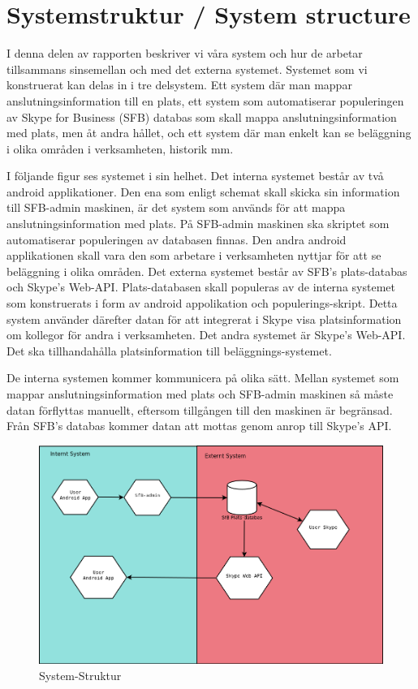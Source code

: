 \documentclass[a4paper,12pt]{article}
\begin{document}
\section{Systemstruktur / System structure}
I denna delen av rapporten beskriver vi våra system och hur de arbetar tillsammans sinsemellan och med det externa systemet.
Systemet som vi konstruerat kan delas in i tre delsystem. Ett system där man mappar anslutningsinformation till en plats, ett system som automatiserar populeringen av Skype for Business (SFB) databas som skall mappa anslutningsinformation med plats, men åt andra hållet, och ett system där man enkelt kan se beläggning i olika områden i verksamheten, historik mm.

I följande figur  %
ses systemet i sin helhet. Det interna systemet består av två android applikationer. Den ena som enligt schemat skall skicka sin information till SFB-admin maskinen, är det system som används för att mappa anslutningsinformation med plats. På SFB-admin maskinen ska skriptet som automatiserar populeringen av databasen finnas. Den andra android applikationen skall vara den som arbetare i verksamheten nyttjar för att se beläggning i olika områden.
Det externa systemet består av SFB's plats-databas och Skype's Web-API. %
Plats-databasen skall populeras av de interna systemet som konstruerats i form av android appolikation och populerings-skript. Detta system använder därefter datan för att integrerat i Skype visa platsinformation om kollegor för andra i verksamheten. Det andra systemet är Skype's Web-API. Det ska tillhandahålla platsinformation till beläggnings-systemet.

De interna systemen kommer kommunicera på olika sätt. Mellan systemet som mappar anslutningsinformation med plats och SFB-admin maskinen så måste datan förflyttas manuellt, eftersom tillgången till den maskinen är begränsad. Från SFB's databas kommer datan att mottas genom anrop till Skype's API. %

\begin{figure}
	\includegraphics[width=15cm]{media/systemStruktur.png}
	\caption{System-Struktur}
	\label{}
\end{figure}
\end{document}
